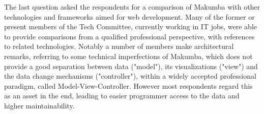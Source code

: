 \documentclass{llncs}
\begin{document}
The last question asked the respondents for a comparison of Makumba with other technologies and frameworks aimed for web development. Many of the former or present members of the Tech Committee, currently working in IT jobs, were able to provide comparisons from a qualified professional perspective, with references to related technologies. Notably a number of members make architectural remarks, referring to some technical imperfections of Makumba, which does not provide a good separation between data ("model"), its visualizations ("view") and the data change mechanisms ("controller"), within a widely accepted professional paradigm, called Model-View-Controller. However most respondents regard this as an asset in the end, leading to easier programmer access to the data and higher maintainability.


%	

\end{document}
